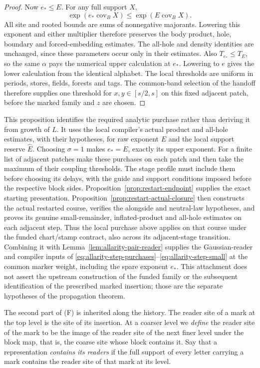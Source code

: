 \begin{proof}
Now $e_*\le E$. For any full support $X$,
\[
 \exp(e_*\operatorname{cov}_B X)
 \le\exp(E\operatorname{cov}_B X).
\]
All site and rooted bounds are sums of nonnegative majorants.
Lowering this exponent and either multiplier therefore preserves
the body product, hole, boundary and forced-embedding estimates.
The all-hole and density identities are unchanged, since these
parameters occur only in their estimates. Also $T_{e_*}\le T_E$,
so the same $\alpha$ pays the numerical upper calculation at $e_*$.
Lowering to $e$ gives the lower calculation from the identical
alphabet. The local thresholds are uniform in periods, stores,
fields, forests and tags. The common-band selection of the handoff
therefore supplies one threshold for $x,y\in[s/2,s]$ on this
fixed adjacent patch, before the marked family and $z$ are chosen.
\end{proof}

This proposition identifies the required analytic purchase rather than
deriving it from growth of $L$. It uses the local compiler's actual
product and all-hole estimates, with their hypotheses, for raw exponent $E$
and the local support reserve $\widehat E$.
Choosing $\sigma=1$ makes $e_*=E$, exactly its upper exponent.
For a finite list of adjacent patches make these purchases on each
patch and then take the maximum of their coupling thresholds. The
stage profile must include them before choosing its delays, with
the guide and support conditions imposed before the respective
block sides. Proposition~\ref{prop:restart-endpoint} supplies the exact starting
presentation. Proposition~\ref{prop:restart-actual-closure} then constructs
the actual restarted course, verifies the alongside and neutral-law
hypotheses, and proves its genuine small-remainder, inflated-product and
all-hole estimates on each adjacent step. Thus the local purchase above
applies on that course under the funded chart/stamp contract, also across
its adjacent-stage transition. Combining it with
Lemma~\ref{lem:allarity-pair-reader} supplies the Gaussian-reader and
compiler inputs of \eqref{eq:allarity-step-purchases}--\eqref{eq:allarity-step-small}
at the common marker weight, including the spare exponent $e_*$.
This attachment does not assert the upstream construction of the funded
family or the subsequent identification of the prescribed marked
insertion; those are the separate hypotheses of the propagation theorem.

The second part of (F) is inherited along the history. The reader site
of a mark at the top level is the site of its insertion. At a coarser
level we \emph{define} the reader site of the mark to be the image of the
reader site of the next finer level under the block map, that is, the
coarse site whose block contains it. Say that a representation
\emph{contains its readers} if the full support of every letter carrying
a mark contains the reader site of that mark at its level.

